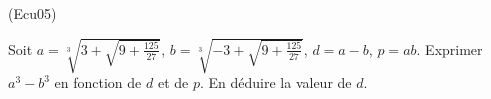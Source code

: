 \begin{tiny}(Ecu05)\end{tiny} \label{Ecu05} Soit $a=\sqrt[3]{3+\sqrt{9+\frac{125}{27}}}$, $b=\sqrt[3]{-3+\sqrt{9+\frac{125}{27}}}$, \newline $d=a-b$, $p=ab$. Exprimer $a^{3}-b^{3}$ en fonction de $d$ et de $p$. En déduire la valeur de $d.$